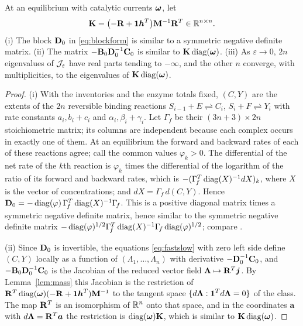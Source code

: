\begin{proposition}\label{prop:slow}
At an equilibrium with catalytic currents \(\boldsymbol\omega\), let
\begin{equation}\label{eq:K}
 \mathbf K=\bigl(-\mathbf R+\boldsymbol 1\boldsymbol h^{T}\bigr)\mathbf M^{-1}\mathbf R^{T}\in\mathbb R^{n\times n}.
\end{equation}
\textup{(i)} The block \(\mathbf D_0\) in \eqref{eq:blockform} is similar to a symmetric negative
definite matrix. \textup{(ii)} The matrix \(-\mathbf B_0\mathbf D_0^{-1}\mathbf C_0\) is similar to
\(\mathbf K\operatorname{diag}(\boldsymbol\omega)\). \textup{(iii)} As \(\varepsilon\to0\), \(2n\) eigenvalues of
\(\mathcal J_\varepsilon\) have real parts tending to \(-\infty\), and the other \(n\) converge, with
multiplicities, to the eigenvalues of \(\mathbf K\operatorname{diag}(\boldsymbol\omega)\).
\end{proposition}
\begin{proof}
(i) With the inventories and the enzyme totals fixed, \((C,Y)\) are the extents of the \(2n\)
reversible binding reactions \(S_{i-1}+E\rightleftharpoons C_i\), \(S_i+F\rightleftharpoons Y_i\)
with rate constants \(a_i,b_i+c_i\) and \(\alpha_i,\beta_i+\gamma_i\). Let \(\Gamma_{\!f}\) be
their \((3n+3)\times2n\) stoichiometric matrix; its columns are independent because each
complex occurs in exactly one of them. At an equilibrium the forward and backward rates of
each of these reactions agree; call the common values \(\varphi_k>0\). The differential of the
net rate of the \(k\)th reaction is \(\varphi_k\) times the differential of the logarithm of
the ratio of its forward and backward rates, which is \(-(\Gamma_{\!f}^{T}\operatorname{diag}(X)^{-1}dX)_k\),
where \(X\) is the vector of concentrations; and \(dX=\Gamma_{\!f}\,d(C,Y)\). Hence
\(\mathbf D_0=-\operatorname{diag}(\varphi)\,\Gamma_{\!f}^{T}\operatorname{diag}(X)^{-1}\Gamma_{\!f}\). This is a positive diagonal matrix times a symmetric negative definite
matrix, hence similar to the symmetric negative definite matrix
\(-\operatorname{diag}(\varphi)^{1/2}\Gamma_{\!f}^{T}\operatorname{diag}(X)^{-1}\Gamma_{\!f}\operatorname{diag}(\varphi)^{1/2}\); compare
\cite{HornJackson1972}.

(ii) Since \(\mathbf D_0\) is invertible, the equations \eqref{eq:fastslow} with zero left side
define \((C,Y)\) locally as a function of \((\Lambda_1,\dots,\Lambda_n)\) with derivative
\(-\mathbf D_0^{-1}\mathbf C_0\), and \(-\mathbf B_0\mathbf D_0^{-1}\mathbf C_0\) is the Jacobian of the reduced
vector field \(\boldsymbol\Lambda\mapsto\mathbf R^{T}\boldsymbol j\). By Lemma~\ref{lem:mass} this Jacobian is the
restriction of \(\mathbf R^{T}\operatorname{diag}(\boldsymbol\omega)(-\mathbf R+\boldsymbol 1\boldsymbol h^{T})\mathbf M^{-1}\) to the tangent space
\(\{d\boldsymbol\Lambda:\boldsymbol 1^{T}d\boldsymbol\Lambda=0\}\) of the class. The map \(\mathbf R^{T}\) is an isomorphism of \(\mathbb R^n\)
onto that space, and in the coordinates \(\boldsymbol a\) with \(d\boldsymbol\Lambda=\mathbf R^{T}\boldsymbol a\)
the restriction is \(\operatorname{diag}(\boldsymbol\omega)\mathbf K\), which is similar to \(\mathbf K\operatorname{diag}(\boldsymbol\omega)\).


\end{proof}
